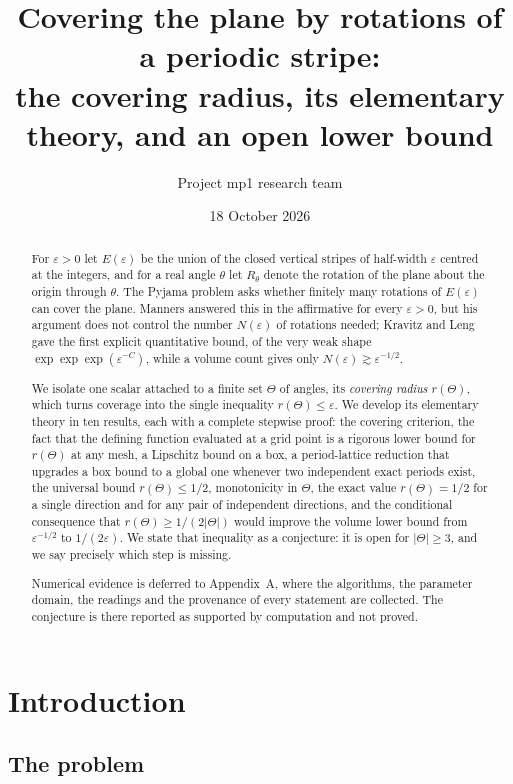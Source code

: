 \documentclass[11pt]{article}
\title{Covering the plane by rotations of a periodic stripe:\\
the covering radius, its elementary theory, and an open lower bound}
\author{Project mp1 research team}
\date{18 October 2026}
\theoremstyle{plain}
\theoremstyle{definition}
\theoremstyle{remark}
\begin{document}
\maketitle

\begin{abstract}
For $\varepsilon>0$ let $E(\varepsilon)$ be the union of the closed vertical stripes of half-width
$\varepsilon$ centred at the integers, and for a real angle $\theta$ let $R_\theta$ denote the rotation
of the plane about the origin through $\theta$. The Pyjama problem asks whether finitely many rotations
of $E(\varepsilon)$ can cover the plane. Manners answered this in the affirmative for every
$\varepsilon>0$, but his argument does not control the number $N(\varepsilon)$ of rotations needed;
Kravitz and Leng gave the first explicit quantitative bound, of the very weak shape
$\exp\exp\exp(\varepsilon^{-C})$, while a volume count gives only
$N(\varepsilon)\gtrsim\varepsilon^{-1/2}$.

We isolate one scalar attached to a finite set $\Theta$ of angles, its \emph{covering radius}
$r(\Theta)$, which turns coverage into the single inequality $r(\Theta)\le\varepsilon$. We develop its
elementary theory in ten results, each with a complete stepwise proof: the covering criterion, the
fact that the defining function evaluated at a grid point is a rigorous lower bound for $r(\Theta)$ at
any mesh, a Lipschitz bound on a box, a period-lattice reduction that upgrades a box bound to a global
one whenever two independent exact periods exist, the universal bound $r(\Theta)\le1/2$, monotonicity
in $\Theta$, the exact value $r(\Theta)=1/2$ for a single direction and for any pair of independent
directions, and the conditional consequence that $r(\Theta)\ge1/(2|\Theta|)$ would improve the volume
lower bound from $\varepsilon^{-1/2}$ to $1/(2\varepsilon)$. We state that inequality as a conjecture:
it is open for $|\Theta|\ge3$, and we say precisely which step is missing.

Numerical evidence is deferred to Appendix~A, where the algorithms, the parameter domain, the readings
and the provenance of every statement are collected. The conjecture is there reported as supported by
computation and not proved.
\end{abstract}

\section{Introduction}
\label{sec:intro}

\subsection{The problem}
\end{document}

